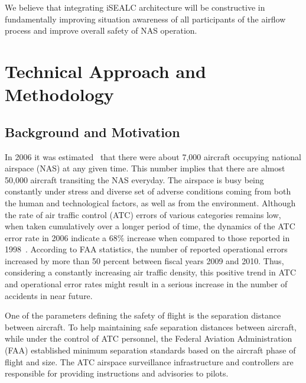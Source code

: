 \documentclass[letter,onecolumn,12pt]{aiaa-tc}
\newcommand{\1}{1_n}
\begin{document}
We believe that integrating iSEALC architecture will be constructive in fundamentally improving situation awareness of all participants of the airflow process and improve overall safety of NAS operation.


\section{Technical Approach and Methodology}

\subsection{Background and Motivation }
In 2006 it was estimated~\cite{FAA_ATO_2006} that there were about 7,000 aircraft occupying national airspace (NAS) at any given time. This number implies that there are almost 50,000 aircraft transiting the NAS everyday. The airspace is busy being constantly under stress and diverse set of adverse conditions coming from both the human and technological factors, as well as from the environment. Although the rate of air traffic control (ATC) errors of various categories remains low,  when taken cumulatively over a longer period of time, the dynamics of the ATC error rate in 2006 indicate a $68\%$  increase when compared to those reported in 1998~\cite{USAToday_2006}. According to FAA statistics, the number of reported operational errors increased by more than 50 percent between fiscal years 2009 and 2010. Thus, considering a constantly increasing air traffic density, this positive trend in ATC and operational error rates might result in a serious increase in the number of accidents in near future.

One of the parameters defining the safety of flight is the separation distance between aircraft. To help maintaining safe separation distances between aircraft, while under the control of ATC personnel, the Federal Aviation Administration (FAA) established minimum separation standards based on the aircraft phase of flight and size. The ATC airspace surveillance infrastructure and controllers are responsible for providing instructions and advisories to pilots.
\end{document}
